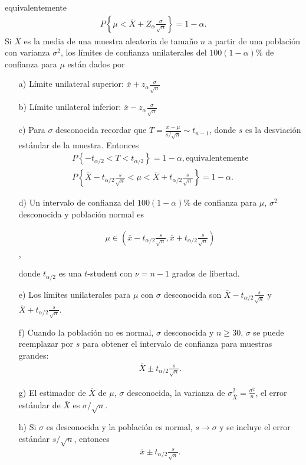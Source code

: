 \documentclass[a4paper]{report} %
\begin{document}
equivalentemente
\begin{eqnarray}P\left\{\mu<\overline{X}+Z_{\alpha}\frac{\sigma}{\sqrt{n}}\right\}=1-\alpha.\end{eqnarray}
Si $\overline{X}$ es la media de una muestra aleatoria de tama\~no $n$  a partir de una poblaci\'on con varianza $\sigma^{2}$, los l\'imites de confianza unilaterales del   $100\left(1-\alpha\right)\%$  de confianza para $\mu$ est\'an dados por
\begin{itemize}
\item[a) ] L\'imite unilateral superior: $\overline{x}+z_{\alpha}\frac{\sigma}{\sqrt{n}}$
\item[b) ] L\'imite unilateral inferior: $\overline{x}-z_{\alpha}\frac{\sigma}{\sqrt{n}}$
\item[c) ] Para $\sigma$ desconocida recordar que $T=\frac{\overline{x}-\mu}{s/\sqrt{n}}\sim t_{n-1}$, donde $s$ es la desviaci\'on est\'andar de la muestra. Entonces
\begin{eqnarray}
P\left\{-t_{\alpha/2}<T<t_{\alpha/2}\right\}=1-\alpha,\textrm{equivalentemente}\\
P\left\{\overline{X}-t_{\alpha/2}\frac{s}{\sqrt{n}}<\mu<\overline{X}+t_{\alpha/2}\frac{s}{\sqrt{n}}\right\}=1-\alpha.
\end{eqnarray}

\item[d) ] Un intervalo de confianza del $100\left(1-\alpha\right)\%$  de confianza para $\mu$, $\sigma^{2}$ desconocida y poblaci\'on normal es
 
 \begin{eqnarray}\mu\in\left(\overline{x}-t_{\alpha/2}\frac{s}{\sqrt{n}},\overline{x}+t_{\alpha/2}\frac{s}{\sqrt{n}}\right)\end{eqnarray}, 
 
 donde $t_{\alpha/2}$ es una $t$-student con $\nu=n-1$ grados de libertad.
\item[e) ] Los l\'imites unilaterales para $\mu$ con $\sigma$ desconocida son $\overline{X}-t_{\alpha/2}\frac{s}{\sqrt{n}}$ y $\overline{X}+t_{\alpha/2}\frac{s}{\sqrt{n}}$.

\item[f) ] Cuando la poblaci\'on no es normal, $\sigma$ desconocida y $n\geq30$, $\sigma$ se puede reemplazar por $s$ para obtener el intervalo de confianza para muestras grandes:
\begin{eqnarray}\overline{X}\pm t_{\alpha/2}\frac{s}{\sqrt{n}}.\end{eqnarray}

\item[g) ] El estimador de $\overline{X}$ de $\mu$,  $\sigma$ desconocida, la varianza de $\sigma_{\overline{X}}^{2}=\frac{\sigma^{2}}{n}$, el error est\'andar de $\overline{X}$ es $\sigma/\sqrt{n}$.

\item[h) ] Si $\sigma$ es desconocida y la poblaci\'on es normal, $s\rightarrow\sigma$ y se incluye el error est\'andar $s/\sqrt{n}$, entonces \begin{eqnarray}\overline{x}\pm t_{\alpha/2}\frac{s}{\sqrt{n}}.\end{eqnarray}
\end{itemize}
\end{document}
